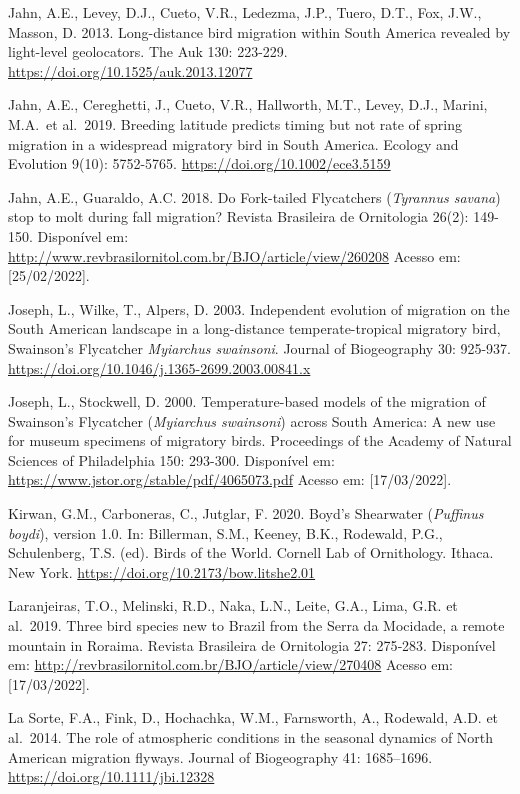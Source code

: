 \documentclass[
  oneside]{scrbook}
\begin{document}
Jahn, A.E., Levey, D.J., Cueto, V.R., Ledezma, J.P., Tuero, D.T., Fox, J.W., Masson, D. 2013. Long-distance bird migration within South America revealed by light-level geolocators. The Auk 130: 223-229. \url{https://doi.org/10.1525/auk.2013.12077}

Jahn, A.E., Cereghetti, J., Cueto, V.R., Hallworth, M.T., Levey, D.J., Marini, M.A.~et al.~2019. Breeding latitude predicts timing but not rate of spring migration in a widespread migratory bird in South America. Ecology and Evolution 9(10): 5752-5765. \url{https://doi.org/10.1002/ece3.5159}

Jahn, A.E., Guaraldo, A.C. 2018. Do Fork-tailed Flycatchers (\emph{Tyrannus savana}) stop to molt during fall migration? Revista Brasileira de Ornitologia 26(2): 149-150. Disponível em: \url{http://www.revbrasilornitol.com.br/BJO/article/view/260208} Acesso em: {[}25/02/2022{]}.

Joseph, L., Wilke, T., Alpers, D. 2003. Independent evolution of migration on the South American landscape in a long-distance temperate-tropical migratory bird, Swainson's Flycatcher \emph{Myiarchus swainsoni}. Journal of Biogeography 30: 925-937. \url{https://doi.org/10.1046/j.1365-2699.2003.00841.x}

Joseph, L., Stockwell, D. 2000. Temperature-based models of the migration of Swainson's Flycatcher (\emph{Myiarchus swainsoni}) across South America: A new use for museum specimens of migratory birds. Proceedings of the Academy of Natural Sciences of Philadelphia 150: 293-300. Disponível em: \url{https://www.jstor.org/stable/pdf/4065073.pdf} Acesso em: {[}17/03/2022{]}.

Kirwan, G.M., Carboneras, C., Jutglar, F. 2020. Boyd's Shearwater (\emph{Puffinus boydi}), version 1.0. In: Billerman, S.M., Keeney, B.K., Rodewald, P.G., Schulenberg, T.S. (ed). Birds of the World. Cornell Lab of Ornithology. Ithaca. New York. \url{https://doi.org/10.2173/bow.litshe2.01}

Laranjeiras, T.O., Melinski, R.D., Naka, L.N., Leite, G.A., Lima, G.R. et al.~2019. Three bird species new to Brazil from the Serra da Mocidade, a remote mountain in Roraima. Revista Brasileira de Ornitologia 27: 275‑283. Disponível em: \url{http://revbrasilornitol.com.br/BJO/article/view/270408} Acesso em: {[}17/03/2022{]}.

La Sorte, F.A., Fink, D., Hochachka, W.M., Farnsworth, A., Rodewald, A.D. et al.~2014. The role of atmospheric conditions in the seasonal dynamics of North American migration flyways. Journal of Biogeography 41: 1685--1696. \url{https://doi.org/10.1111/jbi.12328}
\end{document}
